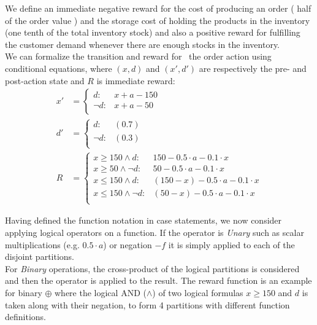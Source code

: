 \documentclass[letterpaper]{article}
\renewcommand{\-}{\text{-}}
\begin{document}
\begin{example*}
We define an immediate negative reward for the cost of producing an order ( half of the order value ) and the storage cost of holding the products in the inventory (one tenth of the total inventory stock) and also a positive reward for fulfilling the customer demand whenever there are enough stocks in the inventory.\\
We can formalize the transition and reward for \InventoryControl\ the order action using conditional equations, where $(x,d)$
and $(x',d')$ are respectively the pre- and post-action state and $R$ is immediate reward:
{\footnotesize
\begin{align*}
x' & = \begin{cases}
d     : & x + a - 150 \\
\neg d: & x + a - 50    \\
\end{cases}\\
d' & =  \begin{cases}
d     : &(0.7)\\
\neg d: &(0.3)\\
\end{cases}\\
R & = \begin{cases}
x \geq 150 \wedge d: & 150 - 0.5\cdot a - 0.1\cdot x \\
x \geq 50 \wedge \neg d: & 50 - 0.5\cdot a - 0.1\cdot x  \\
x \leq 150 \wedge d: &  (150-x)-0.5\cdot a - 0.1\cdot x \\
x \leq 150 \wedge \neg d: & (50-x)- 0.5\cdot a - 0.1\cdot x \\
\end{cases}
\end{align*}}
\end{example*}

Having defined the function notation in case statements, we now consider applying logical operators on a function. 
If the operator is \textit{Unary} such as scalar multiplications (e.g. $0.5 \cdot a$) or negation $-f$ it is simply applied to each of the disjoint partitions. 
\\ For \textit{Binary} operations, the cross-product of the logical partitions is considered and then the operator is applied to the result. The reward function is an 
example for binary $\oplus$ where the logical AND ($\wedge$) of two logical formulas  $x \geq 150 $ and $d$ is taken along with their negation, to form 4 partitions with different function definitions. \\
\end{document}
